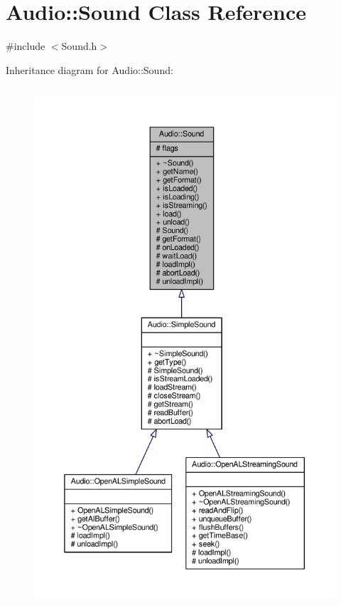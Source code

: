 \hypertarget{classAudio_1_1Sound}{}\section{Audio\+:\+:Sound Class Reference}
\label{classAudio_1_1Sound}


{\ttfamily \#include $<$Sound.\+h$>$}



Inheritance diagram for Audio\+:\+:Sound\+:
\nopagebreak
\begin{figure}[H]
\begin{center}
\leavevmode
\includegraphics[height=550pt]{dd/d8a/classAudio_1_1Sound__inherit__graph}
\end{center}
\end{figure}


